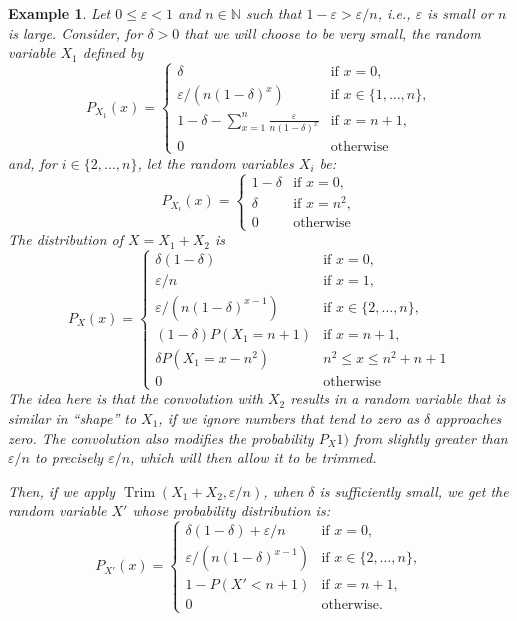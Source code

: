 \documentclass[review]{elsarticle}
\newtheorem{example}{Example}
\DeclareMathOperator{\Trim}{Trim}
\begin{document}
\begin{example}\label{exp:seq}
	Let $0 {\leq} \varepsilon {<}1$ and $n {\in} \mathbb{N}$ such that $1{-}\varepsilon {>} {\varepsilon }/{n}$, i.e.,  
	$\varepsilon$ is small or $n$ is large. 
	Consider, for $\delta>0$ that we will choose to be very small, the random variable $X_1$ defined by
	$$
	P_{X_1}(x) {=} \begin{cases}
	\delta  & \text{if } x=0, \\
	{\varepsilon }/{(n (1-\delta )^{x})} & \text{if } x\in\{1,\dots,n\}, \\
	1{-}\delta{-}\sum_{x=1}^n \frac{\varepsilon }{n(1-\delta )^{x}} & \text{if } x=n+1, \\
	0 & \text{otherwise}
	\end{cases}
	$$
	and, for $i\in\{2,\dots,n\}$, let the random variables $X_i$ be:
	$$
	P_{X_i}(x) =\begin{cases}
	1-\delta  & \text{if } x=0, \\
	\delta     & \text{if } x=n^2, \\
	0 & \text{otherwise}
	\end{cases}
	$$
	The distribution of $X=X_1+X_2$ is
	$$
	P_{X}(x) {=} 
	\begin{cases}
	\delta(1-\delta)  & \text{if } x=0, \\
	{\varepsilon }/{n} & \text{if } x=1, \\
	{\varepsilon }/{(n (1-\delta )^{x-1})} & \text{if } x\in\{2,\dots,n\}, \\
	(1{-}\delta)P(X_1{=}n{+}1)& \text{if } x=n+1, \\
	\delta P(X_1{=}x{-}n^2)& n^2 {\leq} x {\leq} n^2{+}n{+}1 \\
	0 & \text{otherwise}
	\end{cases}
	$$
	The idea here is that the convolution with $X_2$ results in a random variable that is similar in ``shape'' to $X_1$, 
	if we ignore numbers that tend to zero as $\delta$ approaches zero. The convolution also
	modifies the probability $P_{X}1)$ from slightly greater than  $\varepsilon/n$ to precisely $\varepsilon/n$, which will then allow it
	to be trimmed.
	
	Then, if we apply $\Trim(X_1+X_2,\varepsilon/n)$, when $\delta$ is sufficiently small, we get the random variable $X'$ whose probability distribution is:
	$$
	P_{X'}(x) {=} 
	\begin{cases}
	\delta(1-\delta)+{\varepsilon }/{n}  & \text{if } x=0, \\
	{\varepsilon }/{(n (1-\delta )^{x-1})} & \text{if } x\in\{2,\dots,n\}, \\
	1-P(X'{<}n+1)& \text{if } x=n+1, \\
	0 & \text{otherwise.}
	\end{cases}
	$$ 
	

\end{example}
\end{document}
